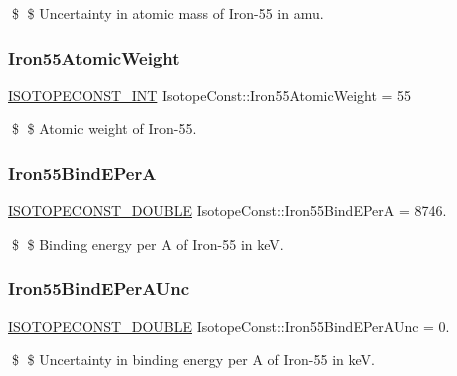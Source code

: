 \$ \$ Uncertainty in atomic mass of Iron-\/55 in amu. \mbox{\label{group___isotope_const-_iron-_fe55_gae6e503e1d5295d051d14f4dc397ce38b}} 
\subsubsection{\texorpdfstring{Iron55\+Atomic\+Weight}{Iron55AtomicWeight}}
{\footnotesize\ttfamily \mbox{\hyperlink{group___isotope_const-_macros_ga5f18360b3e99483a35c32d789e62621c}{I\+S\+O\+T\+O\+P\+E\+C\+O\+N\+S\+T\+\_\+\+I\+NT}} Isotope\+Const\+::\+Iron55\+Atomic\+Weight = 55}

\$ \$ Atomic weight of Iron-\/55. \mbox{\label{group___isotope_const-_iron-_fe55_gab6e50ea6fa7d5036a9868c455a72a368}} 
\subsubsection{\texorpdfstring{Iron55\+Bind\+E\+PerA}{Iron55BindEPerA}}
{\footnotesize\ttfamily \mbox{\hyperlink{group___isotope_const-_macros_ga8f45a7272ce02c0b4c65c44636ed719a}{I\+S\+O\+T\+O\+P\+E\+C\+O\+N\+S\+T\+\_\+\+D\+O\+U\+B\+LE}} Isotope\+Const\+::\+Iron55\+Bind\+E\+PerA = 8746.}

\$ \$ Binding energy per A of Iron-\/55 in keV. \mbox{\label{group___isotope_const-_iron-_fe55_ga3517723a56fa0364feadba015201b5ec}} 
\subsubsection{\texorpdfstring{Iron55\+Bind\+E\+Per\+A\+Unc}{Iron55BindEPerAUnc}}
{\footnotesize\ttfamily \mbox{\hyperlink{group___isotope_const-_macros_ga8f45a7272ce02c0b4c65c44636ed719a}{I\+S\+O\+T\+O\+P\+E\+C\+O\+N\+S\+T\+\_\+\+D\+O\+U\+B\+LE}} Isotope\+Const\+::\+Iron55\+Bind\+E\+Per\+A\+Unc = 0.}

\$ \$ Uncertainty in binding energy per A of Iron-\/55 in keV. \mbox{\label{group___isotope_const-_iron-_fe55_ga75e19089b1242b1e871633c2a2563720}} 
